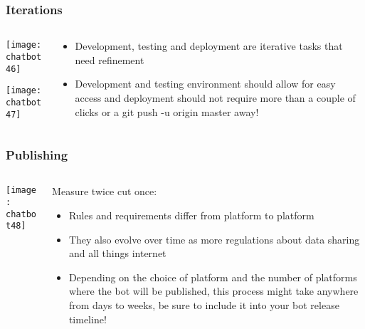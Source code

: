 \begin{frame}[fragile]\frametitle{Iterations}
    \begin{columns}
    \begin{column}[t]{0.5\linewidth}
\begin{center}
\texttt{[image: chatbot46]}

\texttt{[image: chatbot47]}

\end{center}
\end{column}
    \begin{column}[t]{0.5\linewidth}

\begin{itemize}
\item Development, testing and deployment are iterative tasks that need refinement
\item Development and testing environment should allow for easy access and deployment should not require more than a couple of clicks or a git push -u origin master away!
\end{itemize}
\end{column}
\end{columns}
\end{frame}

\begin{frame}[fragile]\frametitle{Publishing}
    \begin{columns}
    \begin{column}[t]{0.5\linewidth}
\begin{center}
\texttt{[image: chatbot48]}
\end{center}


\end{column}
    \begin{column}[t]{0.5\linewidth}
Measure twice cut once:

\begin{itemize}
\item Rules and requirements differ from platform to platform
\item They also evolve over time as more regulations about data sharing and all things internet
\item Depending on the choice of platform and the number of platforms where the bot will be published, this process might take anywhere from days to weeks, be sure to include it into your bot release timeline!
\end{itemize}
\end{column}
\end{columns}
\end{frame}

